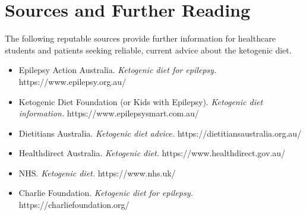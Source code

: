 \section*{Sources and Further Reading}
The following reputable sources provide further information for healthcare students and patients seeking reliable, current advice about the ketogenic diet.
\begin{itemize}
    \item Epilepsy Action Australia. \textit{Ketogenic diet for epilepsy.} https://www.epilepsy.org.au/
    \item Ketogenic Diet Foundation (or Kids with Epilepsy). \textit{Ketogenic diet information.} https://www.epilepsysmart.com.au/
    \item Dietitians Australia. \textit{Ketogenic diet advice.} https://dietitiansaustralia.org.au/
    \item Healthdirect Australia. \textit{Ketogenic diet.} https://www.healthdirect.gov.au/
    \item NHS. \textit{Ketogenic diet.} https://www.nhs.uk/
    \item Charlie Foundation. \textit{Ketogenic diet for epilepsy.} https://charliefoundation.org/
\end{itemize}
